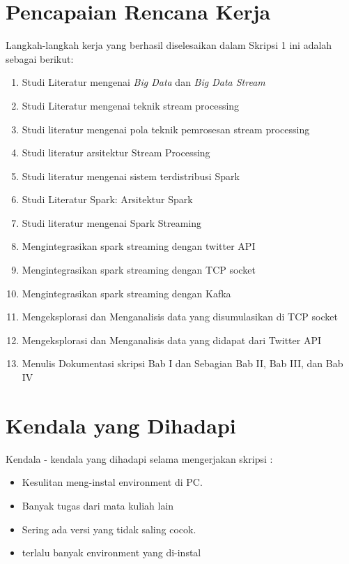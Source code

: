 \documentclass[a4paper,twoside]{article}
\begin{document}
\section{Pencapaian Rencana Kerja}
Langkah-langkah kerja yang berhasil diselesaikan dalam Skripsi 1 ini adalah sebagai berikut:
\begin{enumerate}
\item Studi Literatur mengenai \textit{Big Data} dan \textit{Big Data Stream}
\item Studi Literatur mengenai teknik stream processing
\item Studi literatur mengenai pola teknik pemrosesan stream processing
\item Studi literatur arsitektur Stream Processing
\item Studi literatur mengenai sistem terdistribusi Spark
\item Studi Literatur Spark: Arsitektur Spark
\item Studi literatur mengenai Spark Streaming
\item Mengintegrasikan spark streaming dengan twitter API
\item Mengintegrasikan spark streaming dengan TCP socket
\item Mengintegrasikan spark streaming dengan Kafka
\item Mengeksplorasi dan Menganalisis data yang disumulasikan di TCP socket
\item Mengeksplorasi dan Menganalisis data yang didapat dari Twitter API
\item Menulis Dokumentasi skripsi Bab I dan Sebagian Bab II, Bab III, dan Bab IV
\end{enumerate}


\section{Kendala yang Dihadapi}
Kendala - kendala yang dihadapi selama mengerjakan skripsi :
\begin{itemize}
	\item Kesulitan meng-instal environment di PC.
	\item Banyak tugas dari mata kuliah lain
	\item Sering ada versi yang tidak saling cocok.
	\item terlalu banyak environment yang di-instal
	
\end{itemize}
\end{document}
